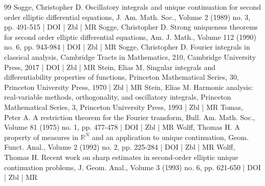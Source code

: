 \documentclass[10pt]{amsart}
\theoremstyle{definition}\newtheorem{defi}[theo]{Definition}\newtheorem{rema}[theo]{Remark}\newtheorem{exam}[theo]{Example}\newtheorem{exem}[theo]{Example}\newtheorem{nota}[theo]{Notation}
\begin{document}
\begin{thebibliography}{99}
 Sogge, Christopher D. Oscillatory integrals and unique continuation for second order elliptic differential equations, J. Am. Math. Soc., Volume 2 (1989) no. 3, pp. 491-515 | DOI | Zbl | MR
 Sogge, Christopher D. Strong uniqueness theorems for second order elliptic differential equations, Am. J. Math., Volume 112 (1990) no. 6, pp. 943-984 | DOI | Zbl | MR
 Sogge, Christopher D. Fourier integrals in classical analysis, Cambridge Tracts in Mathematics, 210, Cambridge University Press, 2017 | DOI | Zbl | MR
 Stein, Elias M. Singular integrals and differentiability properties of functions, Princeton Mathematical Series, 30, Princeton University Press, 1970 | Zbl | MR
 Stein, Elias M. Harmonic analysis: real-variable methods, orthogonality, and oscillatory integrals, Princeton Mathematical Series, 3, Princeton University Press, 1993 | Zbl | MR
 Tomas, Peter A. A restriction theorem for the Fourier transform, Bull. Am. Math. Soc., Volume 81 (1975) no. 1, pp. 477-478 | DOI | Zbl | MR
 Wolff, Thomas H. A property of measures in $\mathbb{R}^{N}$ and an application to unique continuation, Geom. Funct. Anal., Volume 2 (1992) no. 2, pp. 225-284 | DOI | Zbl | MR
 Wolff, Thomas H. Recent work on sharp estimates in second-order elliptic unique continuation problems, J. Geom. Anal., Volume 3 (1993) no. 6, pp. 621-650 | DOI | Zbl | MR
\end{thebibliography}
\end{document}
